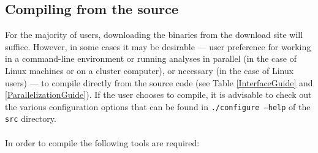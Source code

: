 \subsection{Compiling from the source}
\label{Compilingfromsource}

For the majority of users, downloading the binaries from the \poy download site will suffice.  However, in 
some cases it may be %
desirable --- user preference for working in a command-line environment or running \poy analyses in parallel 
(in the case of Linux machines or on a cluster computer), or necessary (in the case of Linux users) --- to compile 
\poy directly from the source code (see Table \ref{InterfaceGuide} and \ref{ParallelizationGuide}). 
If the user chooses to compile, it is advisable to check out the various configuration 
options that can be found in {\tt ./configure --help} of the \texttt {src} directory. \\
\\
In order to compile \poy the following tools are required:

